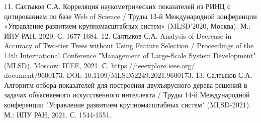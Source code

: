 \documentclass[12pt]{a&t}
\begin{document}
11. Салтыков С.А. Корреляция наукометрических показателей из РИНЦ с цитированием по базе Web of Science / Труды 13-й Международной конференции «Управление развитием крупномасштабных систем» (MLSD'2020, Москва). М.: ИПУ РАН, 2020. С. 1677-1684.
12. Салтыков С.А. Analysis of Decrease in Accuracy of Two-tier Trees without Using Feature Selection / Proceedings of the 14th International Conference "Management of Large-Scale System Development" (MLSD). Moscow: IEEE, 2021. С. https://ieeexplore.ieee.org/ document/9600173. DOI: 10.1109/MLSD52249.2021.9600173.
13. Салтыков С.А. Алгоритм отбора показателей для построения двухъярусного дерева решений в задачах объясняемого искусственного интеллекта / Труды 14-й Международной конференции "Управление развитием крупномасштабных
систем" (MLSD-2021). М.: ИПУ РАН, 2021. С. 1544-1551.
\end{document}
